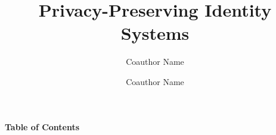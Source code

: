 \documentclass[envcountsame,runningheads,notitlepage]{llncs}
\begin{document}
\renewcommand{\thetheorem}{\thechapter.\arabic{theorem}}
\renewcommand{\thedefinition}{\thechapter.\arabic{definition}}
\renewcommand{\thelemma}{\thechapter.\arabic{lemma}}
\renewcommand{\theproposition}{\thechapter.\arabic{proposition}}
\renewcommand{\thecorollary}{\thechapter.\arabic{corollary}}
\renewcommand{\theexample}{\thechapter.\arabic{example}}
\renewcommand{\theremark}{\thechapter.\arabic{remark}}


  


\title{Privacy-Preserving Identity Systems}

\ifnum{}
\author{
  Coauthor Name \and
  Coauthor Name
}%


\else
\author{} 
\institute{}
\fi


  

    
  
  
  

\makeatletter
\renewcommand\tableofcontents{%
  \clearpage %
  \vspace*{2cm} %
  {\centering\Huge\bfseries Table of Contents\par} %
  \vspace{2em} %
}
\makeatother

\tableofcontents

  
  \listoffigures
  
  
  
  
  
  
  


\ifnum{}
  
 \else
   
 \fi
 
\end{document}
